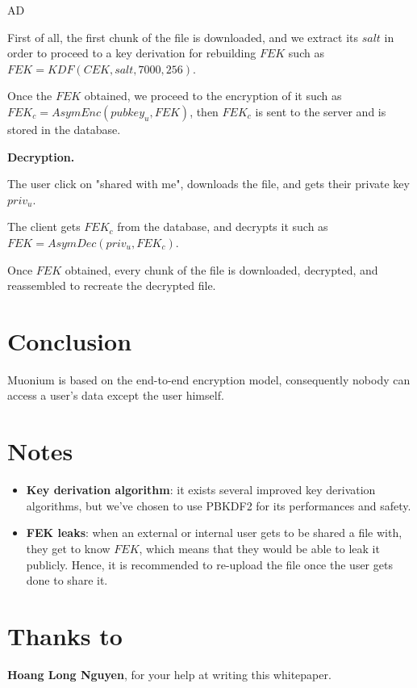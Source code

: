 AD\documentclass[a4paper,10pt]{article}
\begin{document}
First of all, the first chunk of the file is downloaded, and we extract its $salt$ in order to proceed
to a key derivation for rebuilding $FEK$ such as $FEK=KDF(CEK, salt, 7000, 256)$.

Once the $FEK$ obtained, we proceed to the encryption of it such as $FEK_c=AsymEnc(pubkey_u, FEK)$, then
$FEK_c$ is sent to the server and is stored in the database.

\textbf{Decryption.}

The user click on "shared with me", downloads the file, and gets their private key $priv_u$.

The client gets $FEK_c$ from the database, and decrypts it such as $FEK=AsymDec(priv_u, FEK_c)$.

Once $FEK$ obtained, every chunk of the file is downloaded, decrypted, and reassembled to recreate the
decrypted file.

\section{Conclusion}
Muonium is based on the end-to-end encryption model, consequently nobody can access a user's data except the user himself.

\section{Notes}

\begin{itemize}
	\item \textbf{Key derivation algorithm}: it exists several improved key derivation
	algorithms, but we've chosen to use PBKDF2 for its performances and safety.
	\item \textbf{FEK leaks}: when an external or internal user gets to be shared a file with,
	they get to know $FEK$, which means that they would be able to leak it publicly. Hence,
	it is recommended to re-upload the file once the user gets done to share it.
\end{itemize}


\section{Thanks to}

\textbf{Hoang Long Nguyen}, for your help at writing this whitepaper.


\end{document}
